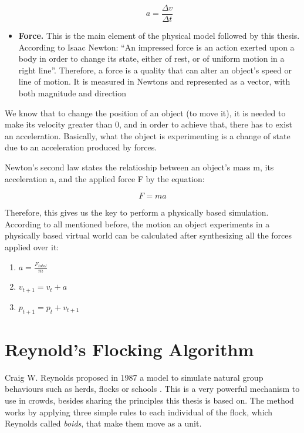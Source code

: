 \begin{itemize}
\begin{equation}
  a=\frac{\Delta v}{\Delta t}
\end{equation}

\item{{\bf Force.} This is the main element of the physical model followed by this thesis. 
 According to Isaac Newton: ``An impressed force is an action exerted upon a body in order to change its state, either of rest, or of uniform motion in a right line''.
 Therefore, a force is a quality that can alter an object's speed or line of motion. It is measured in Newtons and represented as a vector, with both magnitude and direction}

\end{itemize}

We know that to change the position of an object (to move it), it is needed to make its velocity greater than 0, and in order to achieve that, there has to exist an acceleration. Basically, what the object is experimenting is a change of state due to an acceleration produced by forces.

Newton's second law states the relatioship between an object's mass m, its acceleration a, and the applied force F by the equation:

\begin{equation}
  F=ma
\end{equation}

Therefore, this gives us the key to perform a physically based simulation. According to all mentioned before, the motion an object experiments in a physically based virtual world can be calculated after synthesizing all the forces applied over it:

\begin{enumerate}
\item $a = \frac{F_{total}}{m}$
\item $v_{t+1} = v_{t}+a$
\item $p_{t+1} = p_{t}+v_{t+1}$
\end{enumerate}

\section{Reynold's Flocking Algorithm}

Craig W. Reynolds proposed in 1987 a model to simulate natural group behaviours such as herds, flocks or schools \citep{reynolds}. This is a very powerful mechanism to use in crowds, besides sharing the principles this thesis is based on. The method works by applying three simple rules to each individual of the flock, which Reynolds called \emph{boids}, that make them move as a unit.

